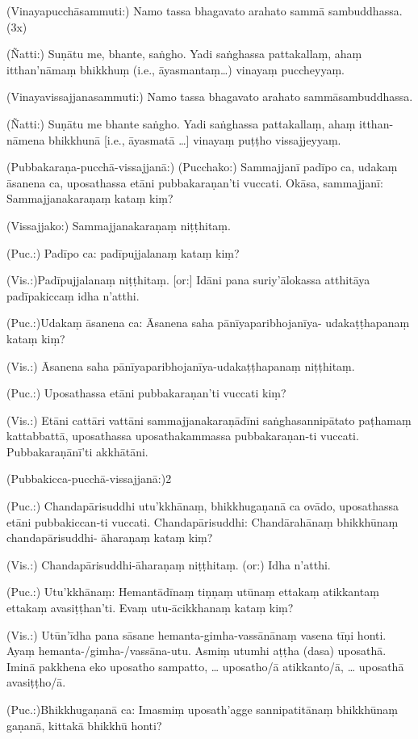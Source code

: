 (Vinayapucchāsammuti:) Namo tassa bhagavato arahato sammā sambuddhassa. (3x)

(Ñatti:) Suṇātu me, bhante, saṅgho. Yadi saṅghassa pattakallaṃ, ahaṃ itthan'nāmaṃ bhikkhuṃ (i.e., āyasmantaṃ…) vinayaṃ puccheyyaṃ.

(Vinayavissajjanasammuti:) Namo tassa bhagavato arahato sammāsambuddhassa.

(Ñatti:) Suṇātu me bhante saṅgho. Yadi saṅghassa pattakallaṃ, ahaṃ itthan-nāmena bhikkhunā [i.e., āyasmatā …] vinayaṃ puṭṭho vissajjeyyaṃ.

(Pubbakaraṇa-pucchā-vissajjanā:) (Pucchako:) Sammajjanī padīpo ca, udakaṃ āsanena ca,  uposathassa etāni pubbakaraṇan’ti vuccati. Okāsa, sammajjanī: Sammajjanakaraṇaṃ kataṃ kiṃ?

(Vissajjako:) Sammajjanakaraṇaṃ niṭṭhitaṃ.

(Puc.:) Padīpo ca: padīpujjalanaṃ kataṃ kiṃ?

(Vis.:)Padīpujjalanaṃ niṭṭhitaṃ. [or:] Idāni pana suriy'ālokassa atthitāya
padīpakiccaṃ idha n’atthi.

(Puc.:)Udakaṃ āsanena ca: Āsanena saha pānīyaparibhojanīya-
udakaṭṭhapanaṃ kataṃ kiṃ?

(Vis.:) Āsanena saha pānīyaparibhojanīya-udakaṭṭhapanaṃ niṭṭhitaṃ.

(Puc.:) Uposathassa etāni pubbakaraṇan’ti vuccati kiṃ?

(Vis.:) Etāni cattāri vattāni sammajjanakaraṇādīni saṅghasannipātato
paṭhamaṃ kattabbattā, uposathassa uposathakammassa pubbakaraṇan-ti
vuccati. Pubbakaraṇānī'ti akkhātāni.

(Pubbakicca-pucchā-vissajjanā:)2

(Puc.:) Chandapārisuddhi utu'kkhānaṃ, bhikkhugaṇanā ca ovādo,
uposathassa etāni pubbakiccan-ti vuccati.
Chandapārisuddhi: Chandārahānaṃ bhikkhūnaṃ chandapārisuddhi-
āharaṇaṃ kataṃ kiṃ?

(Vis.:) Chandapārisuddhi-āharaṇaṃ niṭṭhitaṃ. (or:) Idha n’atthi.

(Puc.:) Utu'kkhānaṃ: Hemantādīnaṃ tiṇṇaṃ utūnaṃ ettakaṃ
atikkantaṃ ettakaṃ avasiṭṭhan’ti. Evaṃ utu-ācikkhanaṃ kataṃ kiṃ?

(Vis.:) Utūn'īdha pana sāsane hemanta-gimha-vassānānaṃ vasena tīṇi
honti. Ayaṃ hemanta-/gimha-/vassāna-utu. Asmiṃ utumhi aṭṭha (dasa)
uposathā. Iminā pakkhena eko uposatho sampatto, … uposatho/ā
atikkanto/ā, … uposathā avasiṭṭho/ā.

(Puc.:)Bhikkhugaṇanā ca: Imasmiṃ uposath'agge sannipatitānaṃ
bhikkhūnaṃ gaṇanā, kittakā bhikkhū honti?

